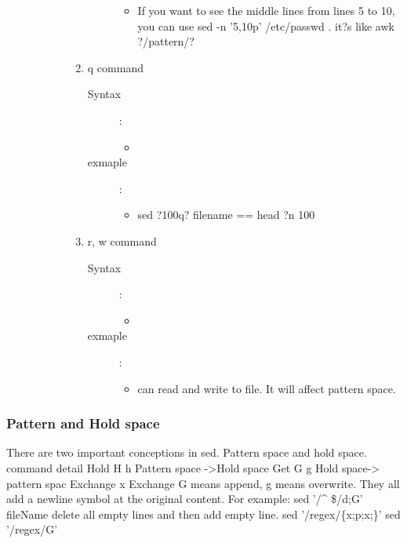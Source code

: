 \documentclass[a4paper,12pt,twoside]{book}
\begin{document}
\begin{CJK*}{UTF8}{song}
\begin{description}
\begin{description}
\begin{enumerate}
\begin{description}
\begin{itemize}
						\item If you want to see the middle lines from lines 5 to 10, you can use sed -n '5,10p' /etc/passwd . it?s like awk ?/pattern/?
						\end{itemize}
					\end{description}
				\item q command
					\begin{description}
					\item[Syntax]: \\
						\begin{itemize}
						\item
						\end{itemize}
					\item[exmaple]: \\
						\begin{itemize}
						\item sed ?100q? filename == head ?n 100
						\end{itemize}
					\end{description}
				\item r, w  command
					\begin{description}
					\item[Syntax]: \\
						\begin{itemize}
						\item
						\end{itemize}
					\item[exmaple]: \\
						\begin{itemize}
						\item can read and write to file. It will affect pattern space.
						\end{itemize}
					\end{description}
				
				\end{enumerate}
			\end{description}
		\end{description}
	\subsubsection{Pattern and Hold space}
	There are two important conceptions in sed. Pattern space and hold space.
	command		detail
	Hold	H h	Pattern space ->Hold space
	Get	G g	Hold space-> pattern spac
	Exchange	x	Exchange
	G means append, g means overwrite. They all add a newline symbol at the original content. For example: sed '/\^{} \$/d;G' fileName delete all empty lines and then add empty line.
	sed '/regex/\{x;p;x;\}'
	sed '/regex/G'

\end{CJK*}
\end{document}
